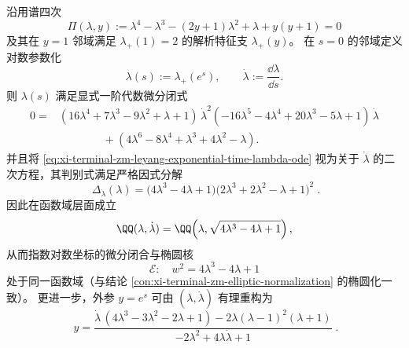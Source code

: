 \begin{conclusion}[指数对数坐标下的 Lee--Yang 微分闭合：\texorpdfstring{$\lambda(s)=\lambda_+(e^s)$}{lambda(s)} 的一阶代数方程与椭圆核一致性]\label{con:xi-terminal-zm-leyang-exponential-time-algebraic-differential-closure}
沿用谱四次
\[
\Pi(\lambda,y):=\lambda^4-\lambda^3-(2y+1)\lambda^2+\lambda+y(y+1)=0
\]
及其在 \(y=1\) 邻域满足 \(\lambda_+(1)=2\) 的解析特征支 \(\lambda_+(y)\)。
在 \(s=0\) 的邻域定义对数参数化
\[
\lambda(s):=\lambda_+(e^s),
\qquad
\dot\lambda:=\frac{\dd \lambda}{\dd s}.
\]
则 \(\lambda(s)\) 满足显式一阶代数微分闭式
\begin{equation}\label{eq:xi-terminal-zm-leyang-exponential-time-lambda-ode}
\boxed{\;
\begin{aligned}
0={}&(16\lambda^4+7\lambda^3-9\lambda^2+\lambda+1)\,\dot\lambda^{2}
(-16\lambda^5-4\lambda^4+20\lambda^3-5\lambda+1)\,\dot\lambda \\
&\qquad\qquad+(4\lambda^6-8\lambda^4+\lambda^3+4\lambda^2-\lambda).
\end{aligned}\;}
\end{equation}
并且将 \eqref{eq:xi-terminal-zm-leyang-exponential-time-lambda-ode} 视为关于 \(\dot\lambda\) 的二次方程，其判别式满足严格因式分解
\begin{equation}\label{eq:xi-terminal-zm-leyang-exponential-time-lambda-ode-discriminant}
\boxed{\;
\Delta_{\dot\lambda}(\lambda)
=\bigl(4\lambda^3-4\lambda+1\bigr)\bigl(2\lambda^3+2\lambda^2-\lambda+1\bigr)^2\; }.
\end{equation}
因此在函数域层面成立
\begin{equation}\label{eq:xi-terminal-zm-leyang-exponential-time-function-field}
\QQ(\lambda,\dot\lambda)=\QQ\!\left(\lambda,\sqrt{4\lambda^3-4\lambda+1}\right),
\end{equation}
从而指数对数坐标的微分闭合与椭圆核
\begin{equation}\label{eq:xi-terminal-zm-leyang-exponential-time-elliptic-kernel}
\mathcal E:\quad w^2=4\lambda^3-4\lambda+1
\end{equation}
处于同一函数域（与结论 \ref{con:xi-terminal-zm-elliptic-normalization} 的椭圆化一致）。
更进一步，外参 \(y=e^s\) 可由 \((\lambda,\dot\lambda)\) 有理重构为
\begin{equation}\label{eq:xi-terminal-zm-leyang-exponential-time-y-reconstruction}
\boxed{\;
y=
\frac{\dot\lambda\,(4\lambda^3-3\lambda^2-2\lambda+1)-2\lambda(\lambda-1)^2(\lambda+1)}{-2\lambda^2+4\lambda\dot\lambda+1}\; }.
\end{equation}
\end{conclusion}
